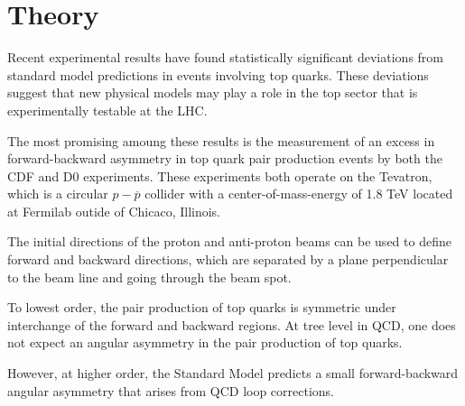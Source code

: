 
%
\section{Theory}






Recent experimental results have found statistically significant deviations from standard model predictions in events involving top quarks.
These deviations suggest that new physical models may play a role in the top sector that is experimentally testable at the LHC.

The most promising amoung these results is the measurement of an excess in forward-backward asymmetry in top quark pair production events by both the CDF and D0 experiments.
These experiments both operate on the Tevatron, which is a circular $p-\overbar{p}$ collider with a center-of-mass-energy of 1.8 TeV located at Fermilab outide of Chicaco, Illinois.

The initial directions of the proton and anti-proton beams can be used to define forward and backward directions, which are separated by a plane perpendicular to the beam line and going through the beam spot.

To lowest order, the pair production of top quarks is symmetric under interchange of the forward and backward regions.
At tree level in QCD, one does not expect an angular asymmetry in the pair production of top quarks.

However, at higher order, the Standard Model predicts a small forward-backward angular asymmetry that arises from QCD loop corrections.


